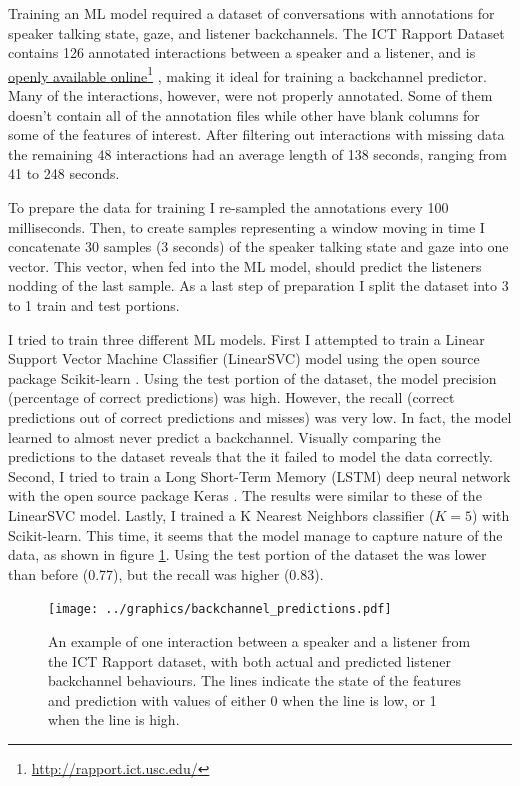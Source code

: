 \documentclass[]{simple-thesis}
\newcommand\fnurl[2]{%
  \href{#2}{#1}\footnote{\url{#2}}%
}
\begin{document}
Training an ML model required a dataset of conversations with annotations for speaker talking state, gaze, and listener backchannels.
The ICT Rapport Dataset \citep{Gratch2007} contains 126 annotated interactions between a speaker and a listener, and is \fnurl{openly available online}{http://rapport.ict.usc.edu/}, making it ideal for training a backchannel predictor.
Many of the interactions, however, were not properly annotated.
Some of them doesn't contain all of the annotation files while other have blank columns for some of the features of interest.
After filtering out interactions with missing data the remaining 48 interactions had an average length of 138 seconds, ranging from 41 to 248 seconds.

To prepare the data for training I re-sampled the annotations every 100 milliseconds.
Then, to create samples representing a window moving in time I concatenate 30 samples (3 seconds) of the speaker talking state and gaze into one vector.
This vector, when fed into the ML model, should predict the listeners nodding of the last sample.
As a last step of preparation I split the dataset into 3 to 1 train and test portions.

I tried to train three different ML models.
First I attempted to train a Linear Support Vector Machine Classifier (LinearSVC) model using the open source package Scikit-learn \citep{Pedregosa2011}.
Using the test portion of the dataset, the model precision (percentage of correct predictions) was high.
However, the recall (correct predictions out of correct predictions and misses) was very low.
In fact, the model learned to almost never predict a backchannel.
Visually comparing the predictions to the dataset reveals that the it failed to model the data correctly.
Second, I tried to train a Long Short-Term Memory (LSTM) deep neural network with the open source package Keras \citep{Chollet2015}.
The results were similar to these of the LinearSVC model.
Lastly, I trained a K Nearest Neighbors classifier ($K = 5$) with Scikit-learn.
This time, it seems that the model manage to capture nature of the data, as shown in figure \ref{fig:system:backchannel_predictions}.
Using the test portion of the dataset the was lower than before (0.77), but the recall was higher (0.83).

\begin{figure}
  \texttt{[image: ../graphics/backchannel\_predictions.pdf]}
  \caption{An example of one interaction between a speaker and a listener from the ICT Rapport dataset, with both actual and predicted listener backchannel behaviours. The lines indicate the state of the features and prediction with values of either 0 when the line is low, or 1 when the line is high.}
  \label{fig:system:backchannel_predictions}
\end{figure}
\end{document}
